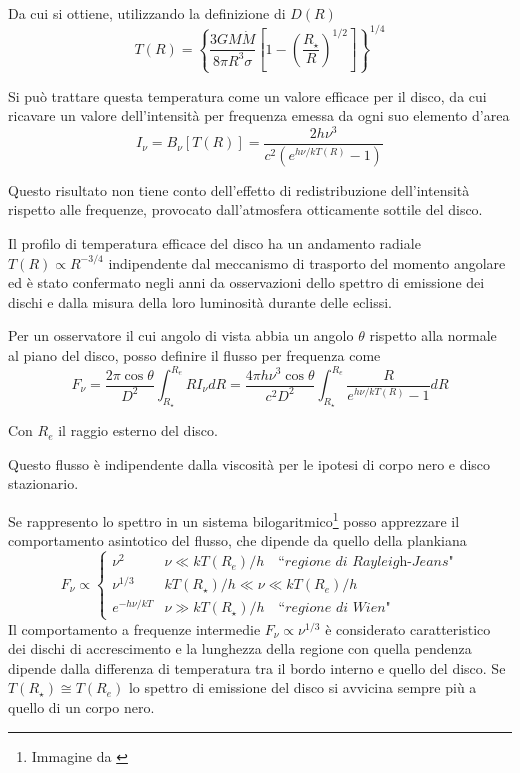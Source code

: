 \documentclass[a4paperbi]{article}
\begin{document}
	Da cui si ottiene, utilizzando la definizione di $D(R)$
	\begin{equation}
		T(R)=\left\{\frac{3GM\dot{M}}{8\pi R^3\sigma}\left[1-\left(\frac{R_{\star}}{R}\right)^{1/2}\right]\right\}^{1/4}
	\end{equation}
	
	Si può trattare questa temperatura come un valore efficace per il disco, da cui ricavare un valore dell'intensità per frequenza emessa da ogni suo elemento d'area
	\begin{equation}
		I_\nu=B_\nu[T(R)]=\frac{2h\nu^3}{c^2(e^{h\nu/kT(R)}-1)}
	\end{equation}
	
	Questo risultato non tiene conto dell'effetto di redistribuzione dell'intensità rispetto alle frequenze, provocato dall'atmosfera otticamente sottile del disco.

	Il profilo di temperatura efficace del disco ha un andamento radiale $T(R)\propto R^{-3/4}$ indipendente dal meccanismo di trasporto del momento angolare ed è stato confermato negli anni da osservazioni dello spettro di emissione dei dischi e dalla misura della loro luminosità durante delle eclissi.
	
	Per un osservatore il cui angolo di vista abbia un angolo $\theta$ rispetto alla normale al piano del disco, posso definire il flusso per frequenza come
	\begin{equation}
		F_\nu=\frac{2\pi \cos{\theta}}{D^2}\int^{R_{e}}_{R_{\star}}RI_\nu dR=\frac{4\pi h\nu^3\cos{\theta}}{c^2D^2}\int^{R_{e}}_{R_{\star}}\frac{R}{e^{h\nu/kT(R)}-1}dR
	\end{equation}
	
	Con $R_e$ il raggio esterno del disco.
	
	Questo flusso è indipendente dalla viscosità per le ipotesi di corpo nero e disco stazionario.

	Se rappresento lo spettro in un sistema bilogaritmico\footnote{Immagine da \cite{GhiselliniRadiativi}} posso apprezzare il comportamento asintotico del flusso, che dipende da quello della plankiana
	\begin{equation}
		F_\nu\propto\begin{cases}
						\nu^2 & \nu\ll kT(R_{e})/h \quad\textit{``regione di Rayleigh-Jeans"}\\
						\nu^{1/3} & kT(R_{\star})/h\ll\nu\ll kT(R_{e})/h\\
						e^{-h\nu/kT} & \nu\gg kT(R_{\star})/h\quad\textit{``regione di Wien"}						
					\end{cases}
	\end{equation}
	Il comportamento a frequenze intermedie $F_\nu\propto\nu^{1/3}$ è considerato caratteristico dei dischi di accrescimento e la lunghezza della regione con quella pendenza dipende dalla differenza di temperatura tra il bordo interno e quello del disco. Se $T(R_{\star})\cong T(R_{e})$ lo spettro di emissione del disco si avvicina sempre più a quello di un corpo nero.
	
\end{document}

